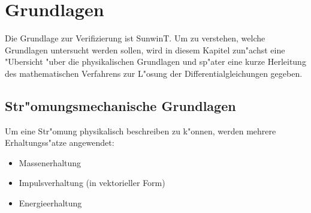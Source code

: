 \newpage
\chapter{Grundlagen}
Die Grundlage zur Verifizierung ist SunwinT. Um zu verstehen, welche Grundlagen untersucht werden sollen, wird in diesem Kapitel zun"achst eine "Ubersicht "uber die physikalischen Grundlagen und sp"ater eine kurze Herleitung des mathematischen Verfahrens zur L"osung der Differentialgleichungen gegeben.


\section{Str"omungsmechanische Grundlagen}
Um eine Str"omung physikalisch beschreiben zu k"onnen, werden mehrere Erhaltungss"atze angewendet:
\begin{itemize}
	\item Massenerhaltung
	\item Impulsverhaltung (in vektorieller Form)
	\item Energieerhaltung
\end{itemize}

